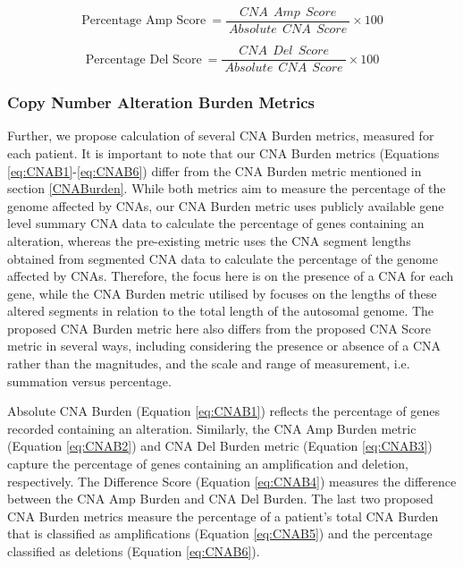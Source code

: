 \begin{equation}
\text{Percentage Amp Score}\: = \frac{\:CNA\:\:Amp\:\:Score\:}{\:Absolute\:\:CNA\:\:Score\:}\times100
\label{eq:CNA5}
\end{equation}

\begin{equation}
\text{Percentage Del Score}\: = \frac{\:CNA\:\:Del\:\:Score\:}{\:Absolute\:\:CNA\:\:Score\:}\times100
\label{eq:CNA6}
\end{equation}

\subsubsection{Copy Number Alteration Burden Metrics}
Further, we propose calculation of several CNA Burden metrics, measured for each patient. It is important to note that our CNA Burden metrics (Equations \ref{eq:CNAB1}-\ref{eq:CNAB6}) differ from the CNA Burden metric \citep{pmid25024180} mentioned in section \ref{CNABurden}. While both metrics aim to measure the percentage of the genome affected by CNAs, our CNA Burden metric uses publicly available gene level summary CNA data to calculate the percentage of genes containing an alteration, whereas the pre-existing metric uses the CNA segment lengths obtained from segmented CNA data to calculate the percentage of the genome affected by CNAs. Therefore, the focus here is on the presence of a CNA for each gene, while the CNA Burden metric utilised by \cite{pmid25024180} focuses on the lengths of these altered segments in relation to the total length of the autosomal genome. The proposed CNA Burden metric here also differs from the proposed CNA Score metric in several ways, including considering the presence or absence of a CNA rather than the magnitudes, and the scale and range of measurement, i.e. summation versus percentage.   

Absolute CNA Burden (Equation \ref{eq:CNAB1}) reflects the percentage of genes recorded containing an alteration. Similarly, the CNA Amp Burden metric (Equation \ref{eq:CNAB2}) and CNA Del Burden metric (Equation \ref{eq:CNAB3}) capture the percentage of genes containing an amplification and deletion, respectively. The Difference Score (Equation \ref{eq:CNAB4}) measures the difference between the CNA Amp Burden and CNA Del Burden. The last two proposed CNA Burden metrics measure the percentage of a patient's total CNA Burden that is classified as amplifications (Equation \ref{eq:CNAB5}) and the percentage classified as deletions (Equation \ref{eq:CNAB6}).

